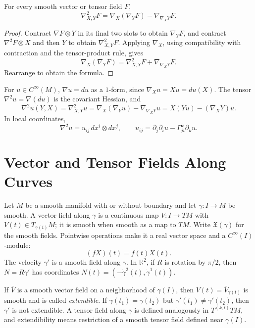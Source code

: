 \begin{proposition}
\label{prop:second-covariant-derivative-formula}
For every smooth vector or tensor field $F$,
\[
\nabla^2_{X,Y}F=\nabla_X(\nabla_YF)-\nabla_{\nabla_XY}F.
\]
\end{proposition}
\begin{proof}
\sketch Contract $\nabla F\otimes Y$ in its final two slots to obtain
$\nabla_YF$, and contract $\nabla^2F\otimes X$ and then $Y$ to obtain
$\nabla^2_{X,Y}F$. Applying $\nabla_X$, using compatibility with contraction
and the tensor-product rule, gives
\[
\nabla_X(\nabla_YF)=\nabla^2_{X,Y}F+\nabla_{\nabla_XY}F.
\]
Rearrange to obtain the formula.
\end{proof}

\begin{example}
\label{ex:covariant-hessian}
\leanok
For $u\in C^\infty(M)$, $\nabla u=du$ as a $1$-form, since
$\nabla_Xu=Xu=du(X)$. The tensor $\nabla^2u=\nabla(du)$ is the covariant
Hessian, and
\[
\nabla^2u(Y,X)=\nabla^2_{X,Y}u
=\nabla_X(\nabla_Yu)-\nabla_{\nabla_XY}u
=X(Yu)-(\nabla_XY)u.
\]
In local coordinates,
\[
\nabla^2u=u_{ij}\,dx^i\otimes dx^j,
\qquad u_{ij}=\partial_j\partial_i u-\Gamma^k_{ji}\partial_ku.
\]
\end{example}

\section{Vector and Tensor Fields Along Curves}

Let $M$ be a smooth manifold with or without boundary and let
$\gamma\colon I\to M$ be smooth. A vector field along $\gamma$ is a
continuous map $V\colon I\to TM$ with $V(t)\in T_{\gamma(t)}M$; it is smooth
when smooth as a map to $TM$. Write $\mathfrak{X}(\gamma)$ for the smooth
fields. Pointwise operations make it a real vector space and a
$C^\infty(I)$-module:
\[
(fX)(t)=f(t)X(t).
\]
The velocity $\gamma'$ is a smooth field along $\gamma$. In $\mathbb R^2$, if
$R$ is rotation by $\pi/2$, then $N=R\gamma'$ has coordinates
$N(t)=(-\dot\gamma^2(t),\dot\gamma^1(t))$.

If $\overline V$ is a smooth vector field on a neighborhood of $\gamma(I)$,
then $V(t)=\overline V_{\gamma(t)}$ is smooth and is called \emph{extendible}.
If $\gamma(t_1)=\gamma(t_2)$ but $\gamma'(t_1)\ne\gamma'(t_2)$, then $\gamma'$
is not extendible. A tensor field along $\gamma$ is defined analogously in
$T^{(k,l)}TM$, and extendibility means restriction of a smooth tensor field
defined near $\gamma(I)$.


